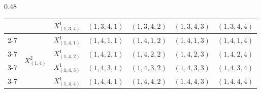\documentclass[12pt]{article}
\begin{document}
\begin{table}[p]
\begin{subtable}[t]{0.48\textwidth}
{\begin{tabular}{|c|c|c|c|c|c|c|}
                                  &                                  & $X_{(1,3,4)}^{1}$ & \cellcolor{blue!40}$(1,3,4,1)$ & \cellcolor{green!40} $(1,3,4,2)$ & \cellcolor{yellow!40} $(1,3,4,3)$ & \cellcolor{red!40}$(1,3,4,4)$ \\ \cline{2-7}
                                  & \multirow{4}{*}{$X_{(1,4)}^{2}$} & $X_{(1,4,1)}^{1}$ & \cellcolor{yellow!40}$(1,4,1,1)$ &\cellcolor{red!40} $(1,4,1,2)$ &\cellcolor{blue!40} $(1,4,1,3)$ &\cellcolor{green!40} $(1,4,1,4)$ \\ \cline{3-7}
                                  &                                  & $X_{(1,4,2)}^{1}$ & \cellcolor{red!40}$(1,4,2,1)$ &\cellcolor{blue!40} $(1,4,2,2)$ &\cellcolor{green!40} $(1,4,2,3)$ &\cellcolor{yellow!40} $(1,4,2,4)$ \\ \cline{3-7}
                                  &                                  & $X_{(1,4,3)}^{1}$ & \cellcolor{blue!40} $(1,4,3,1)$ & \cellcolor{green!40} $(1,4,3,2)$ & \cellcolor{yellow!40} $(1,4,3,3)$ & \cellcolor{red!40}$(1,4,3,4)$ \\ \cline{3-7}
                                  &                                  & $X_{(1,4,4)}^{1}$ & \cellcolor{green!40}$(1,4,4,1)$ &\cellcolor{yellow!40} $(1,4,4,2)$ &\cellcolor{red!40} $(1,4,4,3)$ &\cellcolor{blue!40} $(1,4,4,4)$ \\ \hline
  \end{tabular}%
  }%
\end{subtable}%


\end{table}
\end{document}
